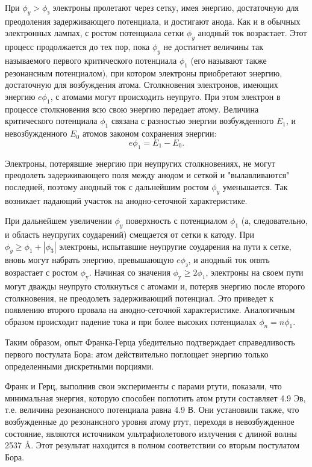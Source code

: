 При $\phi_{y} > \phi_{\text{з}}$ электроны пролетают через сетку, имея энергию, достаточную для преодоления 
задерживающего потенциала, и достигают анода. Как и в обычных электронных лампах, с ростом потенциала сетки $\phi_{y}$ анодный
 ток возрастает. Этот процесс продолжается до тех пор, пока $\phi_{y}$ не достигнет величины
так называемого первого критического потенциала $\phi_{1}$ (его называют также резонансным потенциалом), при котором электроны 
приобретают энергию, достаточную для возбуждения атома. Столкновения электронов, имеющих энергию $e\phi_{1}$, с атомами могут 
происходить неупруго. При этом электрон в процессе столкновения всю свою энергию передает атому. Величина критического
потенциала $\phi_{1}$ связана с разностью энергии возбужденного 
$E_1$, и невозбужденного $E_0$ атомов законом сохранения энергии: $$e\phi_{1}=E_1-E_0.$$

Электроны, потерявшие энергию при неупругих столкновениях, не могут преодолеть задерживающего поля между анодом и сеткой
и "вылавливаются" последней, поэтому анодный ток с дальнейшим ростом 
$\phi_{y}$ уменьшается. Так возникает падающий участок на анодно-сеточной характеристике.

При дальнейшем увеличении $\phi_{y}$ поверхность с потенциалом $\phi_{1}$ (а, следовательно, и область неупругих
соударений) смещается от сетки к катоду. При $\phi_{y} \geqslant \phi_{1}+|\phi_{3}|$ электроны, испытавшие
неупругие соударения на пути к сетке, вновь могут набрать энергию, превышающую $e\phi_{\text{з}}$, и анодный ток опять
возрастает с ростом $\phi_{\text{y}}$. Начиная со значения $\phi_{\text{y}}\geqslant2\phi_{1}$, электроны на своем пути могут дважды неупруго столкнуться с атомами и, потеряв энергию после второго столкновения, не преодолеть задерживающий потенциал. Это приведет к появлению второго провала на анодно-сеточной характеристике. Аналогичным образом происходит падение тока и при более высоких потенциалах $\phi_{n}=n\phi_{1}$.

Таким образом, опыт Франка-Герца убедительно подтверждает справедливость первого постулата Бора: атом действительно поглощает энергию только определенными дискретными порциями.

Франк и Герц, выполнив свои эксперименты с парами ртути, показали, что минимальная энергия, которую способен поглотить атом ртути составляет 4.9 Эв, т.е. величина резонансного потенциала равна 4.9 В. Они установили также, что возбужденные до резонансного уровня атому ртут, переходя в невозбужденное состояние, являются источником ультрафиолетового излучения с длиной волны 2537 \AA. Этот результат находится в полном соответствии со вторым постулатом Бора.

